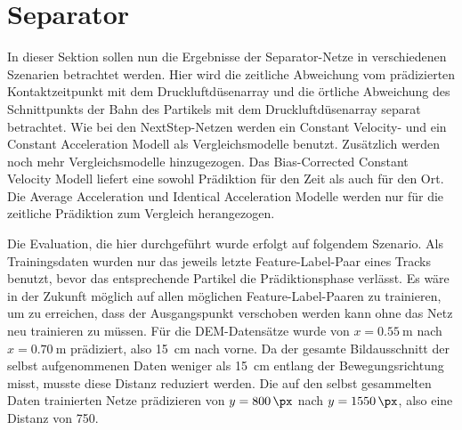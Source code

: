 


\section{Separator}





In dieser Sektion sollen nun die Ergebnisse der Separator-Netze in verschiedenen Szenarien betrachtet werden.
Hier wird  die zeitliche Abweichung vom prädizierten Kontaktzeitpunkt mit dem Druckluftdüsenarray und die örtliche Abweichung des Schnittpunkts der Bahn des Partikels mit dem Druckluftdüsenarray separat betrachtet.
Wie bei den NextStep-Netzen werden ein Constant Velocity- und ein Constant Acceleration Modell 
als Vergleichsmodelle benutzt. 
Zusätzlich werden noch mehr Vergleichsmodelle hinzugezogen. 
Das Bias-Corrected Constant Velocity Modell liefert eine sowohl Prädiktion für den Zeit als auch für den Ort.
Die Average Acceleration und Identical Acceleration Modelle werden nur für die zeitliche Prädiktion zum Vergleich herangezogen.

Die Evaluation, die hier durchgeführt wurde erfolgt auf folgendem Szenario.
Als Trainingsdaten wurden nur das jeweils letzte Feature-Label-Paar eines Tracks benutzt, bevor das entsprechende Partikel die Prädiktionsphase verlässt.
Es wäre in der Zukunft möglich auf allen möglichen Feature-Label-Paaren zu trainieren, um zu erreichen, dass der Ausgangspunkt verschoben werden kann ohne das Netz neu trainieren zu müssen.
Für die DEM-Datensätze wurde von \(x = \SI{0.55}{\meter}\) nach \(x = \SI{0.70}{\meter}\) prädiziert, also \SI{15}{\centi\meter} nach vorne.
Da der gesamte Bildausschnitt der selbst aufgenommenen Daten weniger als \SI{15}{\centi\meter} entlang der Bewegungsrichtung misst, musste diese Distanz reduziert werden.
Die auf den selbst gesammelten Daten trainierten Netze prädizieren von \(y = \SI{800}{\px}\) nach \(y = \SI{1550}{\px}\), also eine Distanz von \SI{750}{\px}.


